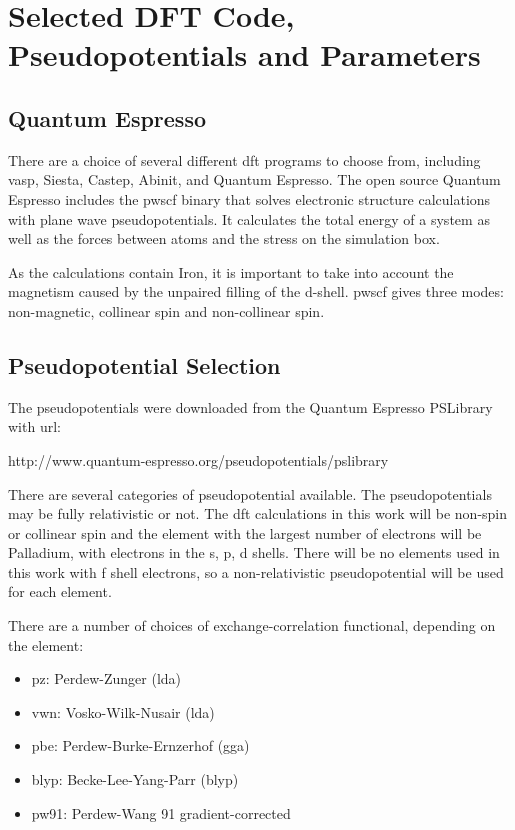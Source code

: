\FloatBarrier
\section[DFT Settings]{Selected DFT Code, Pseudopotentials and Parameters}
\label{section:dftsettings}


\subsection{Quantum Espresso}

There are a choice of several different \acrshort{dft} programs to choose from, including \acrshort{vasp}, Siesta, Castep, Abinit, and Quantum Espresso.  The open source Quantum Espresso includes the \acrshort{pwscf} binary that solves electronic structure calculations with plane wave pseudopotentials.  It calculates the total energy of a system as well as the forces between atoms and the stress on the simulation box.  

As the calculations contain Iron, it is important to take into account the magnetism caused by the unpaired filling of the d-shell.  \acrshort{pwscf} gives three modes: non-magnetic, collinear spin and non-collinear spin.  



\subsection{Pseudopotential Selection}

The pseudopotentials were downloaded from the Quantum Espresso PSLibrary with \acrshort{url}:

http://www.quantum-espresso.org/pseudopotentials/pslibrary 

There are several categories of pseudopotential available.  The pseudopotentials may be fully relativistic or not.  The \acrshort{dft} calculations in this work will be non-spin or collinear spin and the element with the largest number of electrons will be Palladium, with electrons in the s, p, d shells.  There will be no elements used in this work with f shell electrons, so a non-relativistic pseudopotential will be used for each element.

There are a number of choices of exchange-correlation functional, depending on the element:

\begin{itemize}
\item pz: Perdew-Zunger (\acrshort{lda})
\item vwn: Vosko-Wilk-Nusair (\acrshort{lda})
\item pbe: Perdew-Burke-Ernzerhof (\acrshort{gga})
\item blyp: Becke-Lee-Yang-Parr (\acrshort{blyp})
\item pw91: Perdew-Wang 91 gradient-corrected 
\end{itemize}

